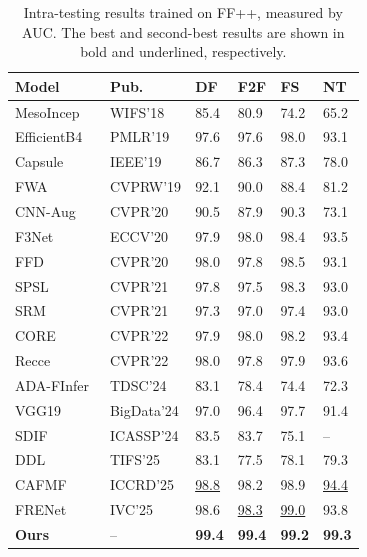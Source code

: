 \documentclass[runningheads]{llncs}
\begin{document}
{
\scriptsize
\setlength{\tabcolsep}{5pt}
\renewcommand{\arraystretch}{1.05}

\begin{table}[!t]
\centering
\caption{Intra-testing results trained on FF++, measured by AUC. The best and second-best results are shown in bold and underlined, respectively.}
\label{tab:manipulation_ff++}
\begin{tabularx}{\linewidth}{lP{1.9cm}YYYY}
\toprule
Model & Pub. & DF & F2F & FS & NT \\
\midrule
MesoIncep~\cite{afchar2018mesonet}         & WIFS'18    & 85.4 & 80.9 & 74.2 & 65.2 \\
EfficientB4~\cite{tan2019efficientnet}     & PMLR'19    & 97.6 & 97.6 & 98.0 & 93.1 \\
Capsule~\cite{nguyen2019capsule}           & IEEE'19    & 86.7 & 86.3 & 87.3 & 78.0 \\
FWA~\cite{li2018exposing}                  & CVPRW'19   & 92.1 & 90.0 & 88.4 & 81.2 \\
CNN-Aug~\cite{wang2020cnn}                 & CVPR'20    & 90.5 & 87.9 & 90.3 & 73.1 \\
F3Net~\cite{qian2020thinking}              & ECCV'20    & 97.9 & 98.0 & 98.4 & 93.5 \\
FFD~\cite{dang2020detection}               & CVPR'20    & 98.0 & 97.8 & 98.5 & 93.1 \\
SPSL~\cite{liu2021spatial}                 & CVPR'21    & 97.8 & 97.5 & 98.3 & 93.0 \\
SRM~\cite{luo2021generalizing}             & CVPR'21    & 97.3 & 97.0 & 97.4 & 93.0 \\
CORE~\cite{ni2022core}                     & CVPR'22    & 97.9 & 98.0 & 98.2 & 93.4 \\
Recce~\cite{cao2022end}                    & CVPR'22    & 98.0 & 97.8 & 97.9 & 93.6 \\
ADA-FInfer~\cite{hu2024ada}                & TDSC'24    & 83.1 & 78.4 & 74.4 & 72.3 \\
VGG19~\cite{sadhya2024deepfake}            & BigData'24 & 97.0 & 96.4 & 97.7 & 91.4 \\
SDIF~\cite{lai2024selective}               & ICASSP'24  & 83.5 & 83.7 & 75.1 & -- \\
DDL~\cite{sun2025ddl}                      & TIFS'25    & 83.1 & 77.5 & 78.1 & 79.3 \\
CAFMF~\cite{meng2025application}           & ICCRD'25   & \underline{98.8} & 98.2 & 98.9 & \underline{94.4} \\
FRENet~\cite{song2025deepfake}             & IVC'25     & 98.6 & \underline{98.3} & \underline{99.0} & 93.8 \\ 
\midrule
{}
\textbf{Ours} & -- & \textbf{99.4} & \textbf{99.4} & \textbf{99.2} & \textbf{99.3} \\
\bottomrule
\end{tabularx}
\end{table}
}
\end{document}
